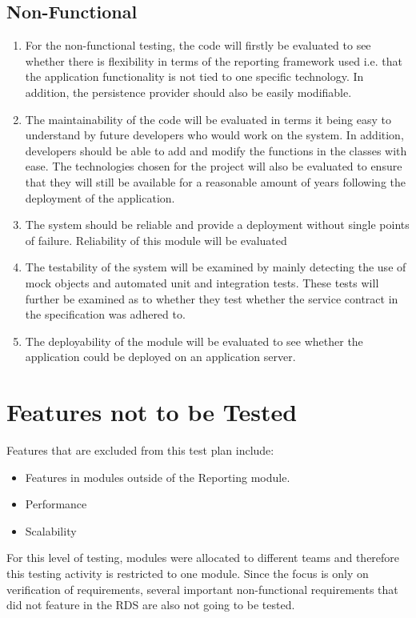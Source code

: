 \subsection{Non-Functional}
\begin{enumerate}
\item For the non-functional testing, the code will firstly be evaluated to see whether there is flexibility in terms of the reporting framework used i.e. that the application functionality is not tied to one specific technology. In addition, the persistence provider should also be easily modifiable. 
\item The maintainability of the code will be evaluated in terms it being easy to understand by future developers who would work on the system. In addition, developers should be able to add and modify the functions in the classes with ease. The technologies chosen for the project will also be evaluated to ensure that they will still be available for a reasonable amount of years following the deployment of the application.
\item The system should be reliable and provide a deployment without single points of failure. Reliability of this module will be evaluated 
\item The testability of the system will be examined by mainly detecting the use of mock objects and automated unit and integration tests. These tests will further be examined as to whether they test whether the service contract in the specification was adhered to.
\item The deployability of the module will be evaluated to see whether the application could be deployed on an application server.
\end{enumerate}

\section{Features not to be Tested}
Features that are excluded from this test plan include:
\begin{itemize}
	\item Features in modules outside of the Reporting module.
	\item Performance
	\item Scalability
\end{itemize}

For this level of testing, modules were allocated to different teams and therefore this testing activity is restricted to one module. Since the focus is only on verification of requirements, several important non-functional requirements that did not feature in the RDS are also not going to be tested.

